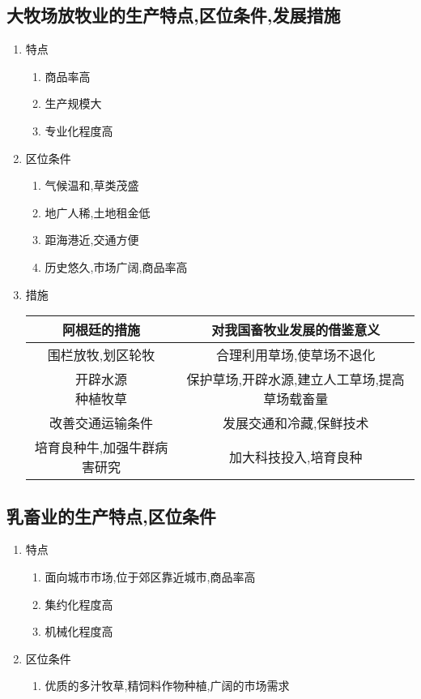 \documentclass[a4paper]{article}
\begin{document}
    \subsection{大牧场放牧业的生产特点,区位条件,发展措施}
    \begin{enumerate}
        \item 特点
        \begin{enumerate}
            \item 商品率高
            \item 生产规模大
            \item 专业化程度高
        \end{enumerate}
        \item 区位条件
        \begin{enumerate}
            \item 气候温和,草类茂盛
            \item 地广人稀,土地租金低
            \item 距海港近,交通方便
            \item 历史悠久,市场广阔,商品率高
        \end{enumerate}
        \item 措施\\
            \begin{tabular}{|c|c|}
                \hline
                阿根廷的措施    &   对我国畜牧业发展的借鉴意义  \\
                \hline
                围栏放牧,划区轮牧   &   合理利用草场,使草场不退化   \\
                \hline
                \makecell[l]{开辟水源 \\ 种植牧草}  & 保护草场,开辟水源,建立人工草场,提高草场载畜量   \\
                \hline
                改善交通运输条件    &   发展交通和冷藏,保鲜技术    \\
                \hline
                培育良种牛,加强牛群病害研究 &   加大科技投入,培育良种   \\
                \hline
            \end{tabular}
    \end{enumerate}
    \subsection{乳畜业的生产特点,区位条件}
    \begin{enumerate}
        \item 特点
        \begin{enumerate}
            \item 面向城市市场,位于郊区靠近城市,商品率高
            \item 集约化程度高
            \item 机械化程度高
        \end{enumerate}
        \item 区位条件
        \begin{enumerate}
            \item 优质的多汁牧草,精饲料作物种植,广阔的市场需求
        \end{enumerate}
    \end{enumerate}
\end{document}

